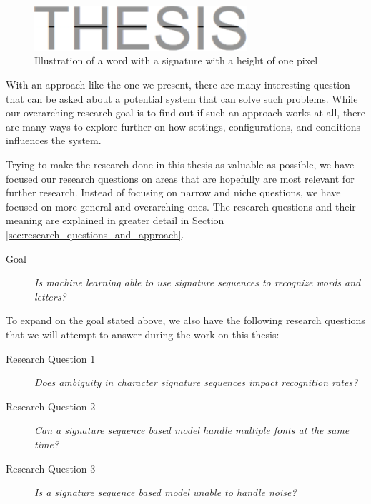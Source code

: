 \begin{figure}[hb]
    \centering
    \includegraphics[width=0.7\textwidth]{fig/chapter1/signature.png}
    \caption{Illustration of a word with a signature with a height of one pixel}
    \label{fig:thesis-signature}
\end{figure}

With an approach like the one we present, there are many interesting question that can be asked about a potential system that can solve such problems. While our overarching research goal is to find out if such an approach works at all, there are many ways to explore further on how settings, configurations, and conditions influences the system.

Trying to make the research done in this thesis as valuable as possible, we have focused our research questions on areas that are hopefully are most relevant for further research. Instead of focusing on narrow and niche questions, we have focused on more general and overarching ones. The research questions and their meaning are explained in greater detail in Section \ref{sec:research_questions_and_approach}.

\begin{description}
    \item[Goal]{\textit{Is machine learning able to use signature sequences to recognize words and letters?}}
\end{description}

To expand on the goal stated above, we also have the following research questions that we will attempt to answer during the work on this thesis:

\begin{description}
    \item[Research Question 1]{\textit{Does ambiguity in character signature sequences impact recognition rates?}}
    \item[Research Question 2]{\textit{Can a signature sequence based model handle multiple fonts at the same time?}}
    \item[Research Question 3]{\textit{Is a signature sequence based model unable to handle noise?}}
\end{description}



